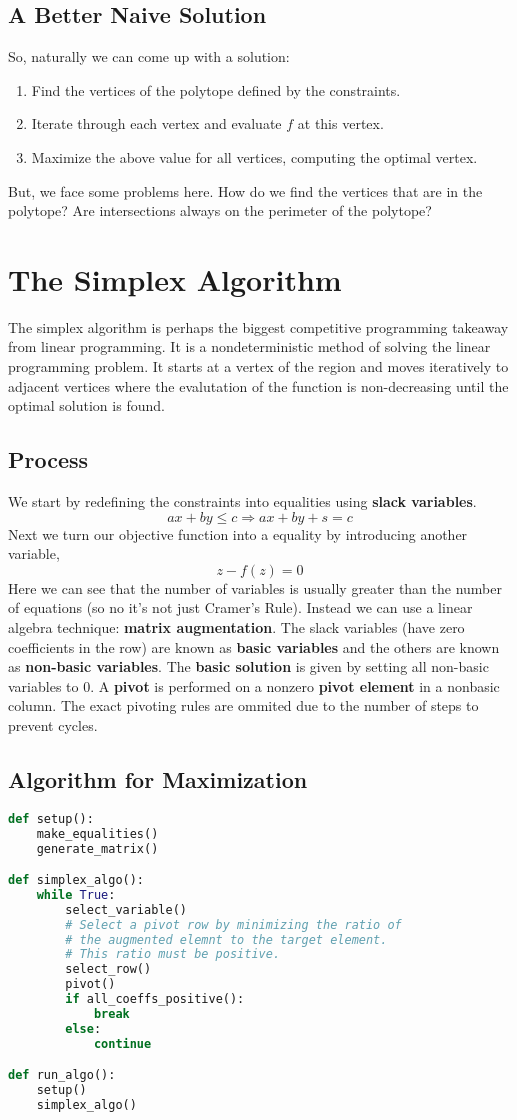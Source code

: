 \documentclass{article}
\begin{document}
\subsection{A Better Naive Solution}
So, naturally we can come up with a solution:
\begin{enumerate}
    \item Find the vertices of the polytope defined by the constraints.
    \item Iterate through each vertex and evaluate $f$ at this vertex.
    \item Maximize the above value for all vertices, computing the optimal vertex.
\end{enumerate}
But, we face some problems here. How do we find the vertices that are in the polytope? 
Are intersections always on the perimeter of the polytope?

\section{The Simplex Algorithm}
The simplex algorithm is perhaps the biggest competitive programming takeaway from linear programming.
It is a nondeterministic method of solving the linear programming problem. It starts at a vertex of the 
region and moves iteratively to adjacent vertices where the evalutation of the function is non-decreasing
until the optimal solution is found.
\subsection{Process}
We start by redefining the constraints into equalities using \textbf{slack variables}. 
$$ax+by\leq c\Rightarrow ax+by+s=c$$
Next we turn our objective function into a equality by introducing another variable,
$$z-f(z)=0$$
Here we can see that the number of variables is usually greater than the number of equations (so no it's not just Cramer's Rule).
Instead we can use a linear algebra technique: \textbf{matrix augmentation}. The slack variables (have zero coefficients in the row)
are known as \textbf{basic variables} and the others are known as \textbf{non-basic variables}. The \textbf{basic solution} is given
by setting all non-basic variables to 0. A \textbf{pivot} is performed on a nonzero \textbf{pivot element} in a nonbasic column.
The exact pivoting rules are ommited due to the number of steps to prevent cycles.

\subsection{Algorithm for Maximization}
\begin{lstlisting}[language=Python]
def setup():
    make_equalities()
    generate_matrix()

def simplex_algo():
    while True:
        select_variable()
        # Select a pivot row by minimizing the ratio of
        # the augmented elemnt to the target element.
        # This ratio must be positive.
        select_row()
        pivot()
        if all_coeffs_positive():
            break
        else:
            continue

def run_algo():
    setup()
    simplex_algo()
    
\end{lstlisting}
\end{document}
